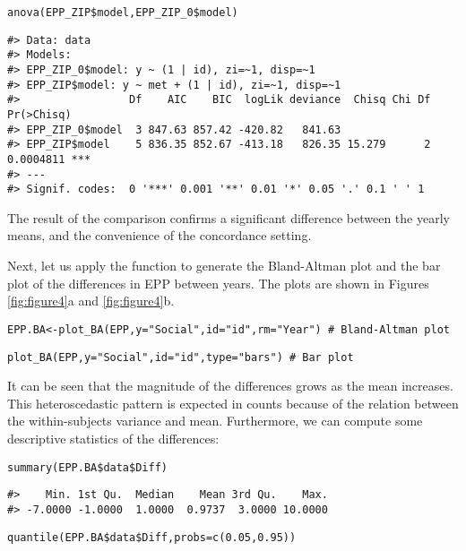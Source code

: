 \begin{verbatim}
anova(EPP_ZIP$model,EPP_ZIP_0$model)
\end{verbatim}

\begin{verbatim}
#> Data: data
#> Models:
#> EPP_ZIP_0$model: y ~ (1 | id), zi=~1, disp=~1
#> EPP_ZIP$model: y ~ met + (1 | id), zi=~1, disp=~1
#>                 Df    AIC    BIC  logLik deviance  Chisq Chi Df Pr(>Chisq)    
#> EPP_ZIP_0$model  3 847.63 857.42 -420.82   841.63                             
#> EPP_ZIP$model    5 836.35 852.67 -413.18   826.35 15.279      2  0.0004811 ***
#> ---
#> Signif. codes:  0 '***' 0.001 '**' 0.01 '*' 0.05 '.' 0.1 ' ' 1
\end{verbatim}

The result of the comparison confirms a significant difference between the yearly means, and the convenience of the concordance setting.

Next, let us apply the function  to generate the Bland-Altman plot and the bar plot of the differences in EPP between years. The plots are shown in Figures \ref{fig:figure4}a and \ref{fig:figure4}b.

\begin{verbatim}
EPP.BA<-plot_BA(EPP,y="Social",id="id",rm="Year") # Bland-Altman plot
\end{verbatim}

\begin{verbatim}
plot_BA(EPP,y="Social",id="id",type="bars") # Bar plot
\end{verbatim}

It can be seen that the magnitude of the differences grows as the mean increases. This heteroscedastic pattern is expected in counts because of the relation between the within-subjects variance and mean. Furthermore, we can compute some descriptive statistics of the differences:

\begin{verbatim}
summary(EPP.BA$data$Diff)
\end{verbatim}

\begin{verbatim}
#>    Min. 1st Qu.  Median    Mean 3rd Qu.    Max. 
#> -7.0000 -1.0000  1.0000  0.9737  3.0000 10.0000
\end{verbatim}

\begin{verbatim}
quantile(EPP.BA$data$Diff,probs=c(0.05,0.95))
\end{verbatim}

